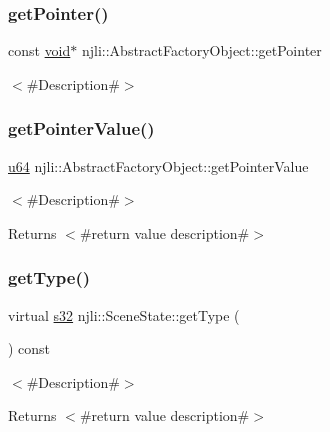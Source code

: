 \subsubsection{\texorpdfstring{get\+Pointer()}{getPointer()}}
{\footnotesize\ttfamily const \mbox{\hyperlink{_thread_8h_af1e856da2e658414cb2456cb6f7ebc66}{void}}$\ast$ njli\+::\+Abstract\+Factory\+Object\+::get\+Pointer}

$<$\#\+Description\#$>$ \mbox{\label{classnjli_1_1_scene_state_a4ffddf141a426a5a07d0ac19f1913811}} 
\subsubsection{\texorpdfstring{get\+Pointer\+Value()}{getPointerValue()}}
{\footnotesize\ttfamily \mbox{\hyperlink{_util_8h_ad758b7a5c3f18ed79d2fcd23d9f16357}{u64}} njli\+::\+Abstract\+Factory\+Object\+::get\+Pointer\+Value}

$<$\#\+Description\#$>$

\begin{DoxyReturn}{Returns}
$<$\#return value description\#$>$ 
\end{DoxyReturn}
\mbox{\label{classnjli_1_1_scene_state_a8945a471807893c9442a17766dbf5dd2}} 
\subsubsection{\texorpdfstring{get\+Type()}{getType()}}
{\footnotesize\ttfamily virtual \mbox{\hyperlink{_util_8h_aa62c75d314a0d1f37f79c4b73b2292e2}{s32}} njli\+::\+Scene\+State\+::get\+Type (\begin{DoxyParamCaption}{ }\end{DoxyParamCaption}) const\hspace{0.3cm}{\ttfamily [virtual]}}

$<$\#\+Description\#$>$

\begin{DoxyReturn}{Returns}
$<$\#return value description\#$>$ 
\end{DoxyReturn}


